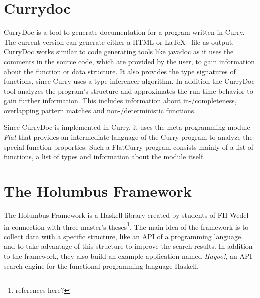 \documentclass[%
	pdftex,%
	a4paper,%
	oneside,%
	chapterprefix,%
	headsepline,%
	12pt%
]{scrbook}
\begin{document}
\section{Currydoc}\label{preliminaries:currydoc}

CurryDoc is a tool to generate documentation for a program written in
Curry. The current version can generate either a HTML or \LaTeX~ file
as output. CurryDoc works similar to code generating tools like
javadoc\cite{javadoc} as it uses the comments in the source code, which
are provided by the user, to gain information about the function or
data structure. It also provides the type signatures of functions,
since Curry uses a type inferencer algorithm. In addition the CurryDoc tool
analyzes the program's structure and approximates the run-time
behavior to gain further information\cite{currydoc2}. This includes information about
in-/completeness, overlapping pattern matches and non-/deterministic
functions.

Since CurryDoc is implemented in Curry, it uses the meta-programming
module \emph{Flat}\cite{flat2} that provides an intermediate language of the Curry
program to analyze the special function proporties. Such a
FlatCurry\cite{flat} program consists mainly of a list of functions, a
list of types and information about the module itself.


\section{The Holumbus Framework}\label{preliminaries:holumbus}
The Holumbus Framework is a Haskell library created by students of FH
Wedel in connection with three master's theses\footnote{references
  here?}. The main idea of the framework is to collect data with a
specific structure, like an API of a programming language, and to take
advantage of this structure to improve the search results. In addition
to the framework, they also build an example application named
\emph{Hayoo!}\cite{hayoo}, an API search engine for the functional
programming language Haskell.\\
\end{document}
